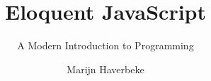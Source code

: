 \documentclass[13pt,oneside]{scrbook}
\date{}
\begin{document}
\frontmatter

\author{Marijn Haverbeke}

\title{Eloquent JavaScript}

\subtitle{A Modern Introduction to Programming}

\maketitle

\tableofcontents

\mainmatter















































\backmatter

\end{document}
